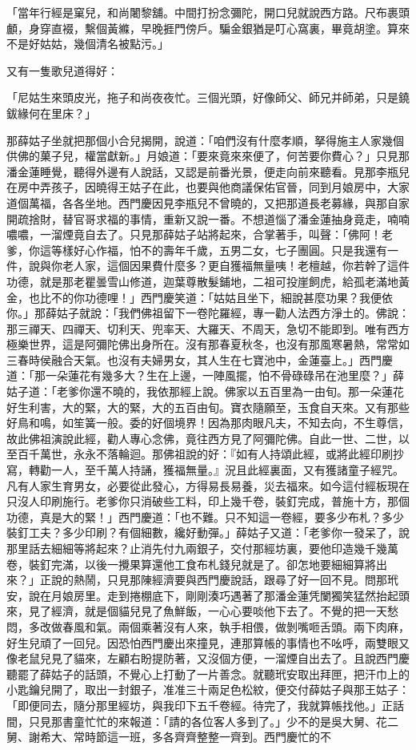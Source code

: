 「當年行經是窠兒，和尚闍黎舖。中間打扮念彌陀，開口兒就說西方路。尺布裹頭顱，身穿直裰，繫個黃縧，早晚捱門傍戶。騙金銀猶是叮心窩裏，畢竟胡塗。算來不是好姑姑，幾個清名被點污。」

又有一隻歌兒道得好：

「尼姑生來頭皮光，拖子和尚夜夜忙。三個光頭，好像師父、師兄并師弟，只是鐃鈸緣何在里床？」

那薛姑子坐就把那個小合兒揭開，說道：「咱們沒有什麼孝順，拏得施主人家幾個供佛的菓子兒，權當獻新。」月娘道：「要來竟來來便了，何苦要你費心？」只見那潘金蓮睡覺，聽得外邊有人說話，又認是前番光景，便走向前來聽看。見那李瓶兒在房中弄孩子，因曉得王姑子在此，也要與他商議保佑官晉，同到月娘房中，大家道個萬福，各各坐地。西門慶因見李瓶兒不曾曉的，又把那道長老募緣，與那自家開疏捨財，替官哥求福的事情，重新又說一番。不想道惱了潘金蓮抽身竟走，喃喃噥噥，一溜煙竟自去了。只見那薛姑子站將起來，合掌著手，叫聲：「佛阿！老爹，你這等樣好心作福，怕不的壽年千歲，五男二女，七子團圓。只是我還有一件，說與你老人家，這個因果費什麼多？更自獲福無量咦！老檀越，你若幹了這件功德，就是那老瞿曇雪山修道，迦葉尊散髮鋪地，二祖可投崖飼虎，給孤老滿地黃金，也比不的你功德哩！」西門慶笑道：「姑姑且坐下，細說甚麼功果？我便依你。」那薛姑子就說：「我們佛祖留下一卷陀羅經，專一勸人法西方淨土的。佛說：那三禪天、四禪天、切利天、兜率天、大羅天、不周天，急切不能即到。唯有西方極樂世界，這是阿彌陀佛出身所在。沒有那春夏秋冬，也沒有那風寒暑熱，常常如三春時侯融合天氣。也沒有夫婦男女，其人生在七寶池中，金蓮臺上。」西門慶道：「那一朵蓮花有幾多大？生在上邊，一陣風擺，怕不骨碌碌吊在池里麼？」薛姑子道：「老爹你還不曉的，我依那經上說。佛家以五百里為一由旬。那一朵蓮花好生利害，大的緊，大的緊，大的五百由旬。寶衣隨願至，玉食自天來。又有那些好鳥和鳴，如笙簧一般。委的好個境界！因為那肉眼凡夫，不知去向，不生尊信，故此佛祖演說此經，勸人專心念佛，竟往西方見了阿彌陀佛。自此一世、二世，以至百千萬世，永永不落輪迴。那佛祖說的好：『如有人持頌此經，或將此經印刷抄寫，轉勸一人，至千萬人持誦，獲福無量。』況且此經裏面，又有獲諸童子經咒。凡有人家生育男女，必要從此發心，方得易長易養，災去福來。如今這付經板現在只沒人印刷施行。老爹你只消破些工料，印上幾千卷，裝釘完成，普施十方，那個功德，真是大的緊！」西門慶道：「也不難。只不知這一卷經，要多少布札？多少裝釘工夫？多少印刷？有個細數，纔好動彈。」薛姑子又道：「老爹你一發呆了，說那里話去細細等將起來？止消先付九兩銀子，交付那經坊裏，要他印造幾千幾萬卷，裝釘完滿，以後一攪果算還他工食布札錢兒就是了。卻怎地要細細算將出來？」正說的熱鬧，只見那陳經濟要與西門慶說話，跟尋了好一回不見。問那玳安，說在月娘房里。走到捲棚底下，剛剛湊巧遇著了那潘金蓮凭闌獨笑猛然抬起頭來，見了經濟，就是個貓兒見了魚鮮飯，一心心要啖他下去了。不覺的把一天愁悶，多改做春風和氣。兩個乘著沒有人來，執手相偎，做剝嘴咂舌頭。兩下肉麻，好生兒頑了一回兒。因恐怕西門慶出來撞見，連那算帳的事情也不吆呼，兩雙眼又像老鼠兒見了貓來，左顧右盼提防著，又沒個方便，一溜煙自出去了。且說西門慶聽罷了薛姑子的話頭，不覺心上打動了一片善念。就聽玳安取出拜匣，把汗巾上的小匙鑰兒開了，取出一封銀子，准准三十兩足色松紋，便交付薛姑子與那王姑子：「即便同去，隨分那里經坊，與我印下五千卷經。待完了，我就算帳找他。」正話間，只見那書童忙忙的來報道：「請的各位客人多到了。」少不的是吳大舅、花二舅、謝希大、常時節這一班，多各齊齊整整一齊到。西門慶忙的不